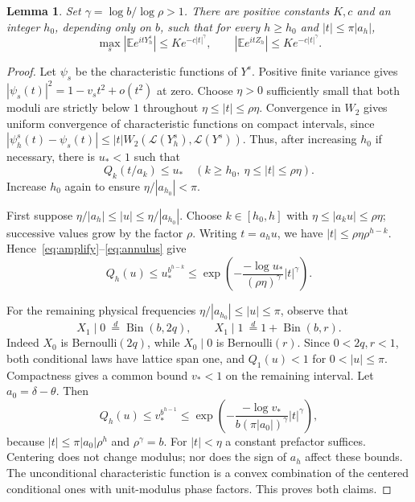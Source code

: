 \documentclass[11pt]{article}
\newtheorem{lemma}[theorem]{Lemma}
\newcommand{\E}{\mathbb E}
\newcommand{\Law}{\mathcal L}
\begin{document}
\begin{lemma}\label{lem:fourier}
Set $\gamma=\log b/\log\rho>1$. There are positive constants $K,c$ and
an integer $h_0$, depending only on $b$, such that for every $h\ge h_0$
and $|t|\le\pi|a_h|$,
\begin{equation}\label{eq:domination}
 \max_s|\E e^{itY_h^s}|\le K e^{-c|t|^\gamma},
 \qquad |\E e^{itZ_h}|\le K e^{-c|t|^\gamma}.
\end{equation}
\end{lemma}
\begin{proof}
Let $\psi_s$ be the characteristic functions of $Y^s$.
Positive finite variance gives
$|\psi_s(t)|^2=1-v_st^2+o(t^2)$ at zero. Choose $\eta>0$ sufficiently
small that both moduli are strictly below $1$ throughout
$\eta\le|t|\le\rho\eta$. Convergence in $W_2$ gives uniform convergence
of characteristic functions on compact intervals, since
$|\psi_h^s(t)-\psi_s(t)|\le|t|W_2(\Law(Y_h^s),\Law(Y^s))$.
Thus, after increasing $h_0$ if necessary, there is $u_*<1$ such that
\begin{equation}\label{eq:annulus}
 Q_k(t/a_k)\le u_*\quad
 (k\ge h_0,\ \eta\le|t|\le\rho\eta).
\end{equation}
Increase $h_0$ again to ensure $\eta/|a_{h_0}|<\pi$.

First suppose
$\eta/|a_h|\le|u|\le\eta/|a_{h_0}|$.
Choose $k\in[h_0,h]$ with
$\eta\le|a_ku|\le\rho\eta$; successive values grow by the factor $\rho$.
Writing $t=a_hu$, we have
$|t|\le\rho\eta\rho^{h-k}$. Hence~\eqref{eq:amplify}--\eqref{eq:annulus}
give
\[
 Q_h(u)\le u_*^{b^{h-k}}
 \le\exp\left(-\frac{-\log u_*}{(\rho\eta)^\gamma}|t|^\gamma\right).
\]

For the remaining physical frequencies
$\eta/|a_{h_0}|\le|u|\le\pi$, observe that
\[
 X_1\mid0\ \overset d=\operatorname{Bin}(b,2q),\qquad
 X_1\mid1\ \overset d=1+\operatorname{Bin}(b,r).
\]
Indeed $X_0$ is Bernoulli$(2q)$, while $X_0\mid0$ is Bernoulli$(r)$.
Since $0<2q,r<1$, both conditional laws have lattice span one, and
$Q_1(u)<1$ for $0<|u|\le\pi$. Compactness gives a common bound $v_*<1$
on the remaining interval. Let $a_0=\delta-\theta$. Then
\[
 Q_h(u)\le v_*^{b^{h-1}}
 \le\exp\left(-\frac{-\log v_*}{b(\pi|a_0|)^\gamma}|t|^\gamma\right),
\]
because $|t|\le\pi|a_0|\rho^h$ and $\rho^\gamma=b$.
For $|t|<\eta$ a constant prefactor suffices. Centering does not change
modulus; nor does the sign of $a_h$ affect these bounds. The unconditional
characteristic function is a convex combination of the centered
conditional ones with unit-modulus phase factors. This proves both claims.
\end{proof}
\end{document}
